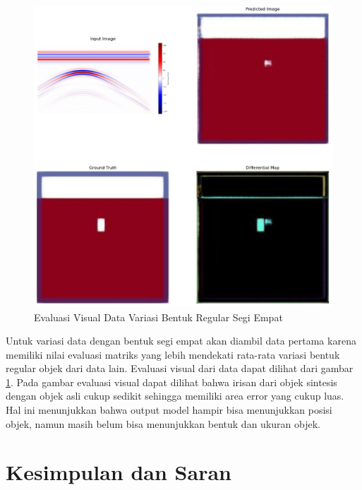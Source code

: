 \documentclass[conference]{IEEEtran}
\begin{document}
\begin{figure}[ht]
  \centering
  \includegraphics[scale=0.15]{gambar/diffMapSegi4.jpg}
  \caption{Evaluasi Visual Data Variasi Bentuk Regular Segi Empat}
  \label{fig:diffmapsegi4}
\end{figure}

Untuk variasi data dengan bentuk segi empat akan diambil data pertama karena memiliki nilai evaluasi matriks yang lebih mendekati rata-rata variasi bentuk regular objek dari data lain. 
Evaluasi visual dari data dapat dilihat dari gambar \ref{fig:diffmapsegi4}. 
Pada gambar evaluasi visual dapat dilihat bahwa irisan dari objek sintesis dengan objek asli cukup sedikit sehingga memiliki area error yang cukup luas. 
Hal ini menunjukkan bahwa output model hampir bisa menunjukkan posisi objek, namun masih belum bisa menunjukkan bentuk dan ukuran objek.

\section{Kesimpulan dan Saran}
 
\end{document}
